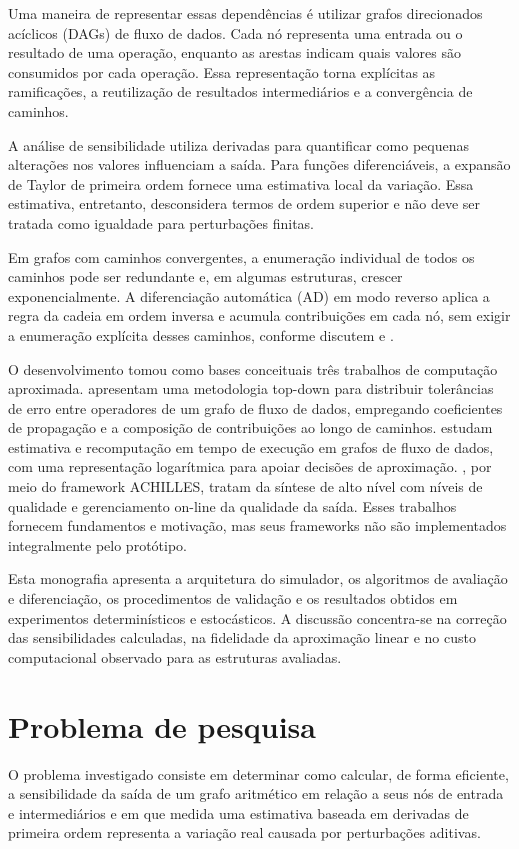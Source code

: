 \documentclass[12pt,openright,oneside,a4paper,brazil]{abntex2}
\begin{document}
Uma maneira de representar essas dependências é utilizar grafos direcionados acíclicos (DAGs) de fluxo de dados. Cada nó representa uma entrada ou o resultado de uma operação, enquanto as arestas indicam quais valores são consumidos por cada operação. Essa representação torna explícitas as ramificações, a reutilização de resultados intermediários e a convergência de caminhos.

A análise de sensibilidade utiliza derivadas para quantificar como pequenas alterações nos valores influenciam a saída. Para funções diferenciáveis, a expansão de Taylor de primeira ordem fornece uma estimativa local da variação. Essa estimativa, entretanto, desconsidera termos de ordem superior e não deve ser tratada como igualdade para perturbações finitas.

Em grafos com caminhos convergentes, a enumeração individual de todos os caminhos pode ser redundante e, em algumas estruturas, crescer exponencialmente. A diferenciação automática (AD) em modo reverso aplica a regra da cadeia em ordem inversa e acumula contribuições em cada nó, sem exigir a enumeração explícita desses caminhos, conforme discutem  e .

O desenvolvimento tomou como bases conceituais três trabalhos de computação aproximada.  apresentam uma metodologia top-down para distribuir tolerâncias de erro entre operadores de um grafo de fluxo de dados, empregando coeficientes de propagação e a composição de contribuições ao longo de caminhos.  estudam estimativa e recomputação em tempo de execução em grafos de fluxo de dados, com uma representação logarítmica para apoiar decisões de aproximação. , por meio do framework ACHILLES, tratam da síntese de alto nível com níveis de qualidade e gerenciamento on-line da qualidade da saída. Esses trabalhos fornecem fundamentos e motivação, mas seus frameworks não são implementados integralmente pelo protótipo.

Esta monografia apresenta a arquitetura do simulador, os algoritmos de avaliação e diferenciação, os procedimentos de validação e os resultados obtidos em experimentos determinísticos e estocásticos. A discussão concentra-se na correção das sensibilidades calculadas, na fidelidade da aproximação linear e no custo computacional observado para as estruturas avaliadas.

\section{Problema de pesquisa}
O problema investigado consiste em determinar como calcular, de forma eficiente, a sensibilidade da saída de um grafo aritmético em relação a seus nós de entrada e intermediários e em que medida uma estimativa baseada em derivadas de primeira ordem representa a variação real causada por perturbações aditivas.
\end{document}

